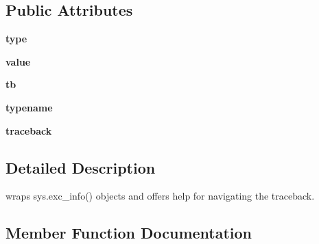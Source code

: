\subsection*{Public Attributes}
\begin{DoxyCompactItemize}
\item 
\mbox{\label{classpy_1_1__code_1_1code_1_1_exception_info_a1aaa65f4f1ee397048c4bbd72bb5db31}} 
{\bfseries type}
\item 
\mbox{\label{classpy_1_1__code_1_1code_1_1_exception_info_a6036b178a038d2d4ff2b2a11360d7666}} 
{\bfseries value}
\item 
\mbox{\label{classpy_1_1__code_1_1code_1_1_exception_info_ad3517cdcbfd12e3563f1fda42b5ae2e2}} 
{\bfseries tb}
\item 
\mbox{\label{classpy_1_1__code_1_1code_1_1_exception_info_a7e0c69b94b015422d14c4bc9985895b2}} 
{\bfseries typename}
\item 
\mbox{\label{classpy_1_1__code_1_1code_1_1_exception_info_a461e177208731c4326fa02afb9378904}} 
{\bfseries traceback}
\end{DoxyCompactItemize}


\subsection{Detailed Description}
\begin{DoxyVerb}wraps sys.exc_info() objects and offers
    help for navigating the traceback.
\end{DoxyVerb}
 

\subsection{Member Function Documentation}
\mbox{\label{classpy_1_1__code_1_1code_1_1_exception_info_a189744015e10339feec4bdc28591049b}} 
